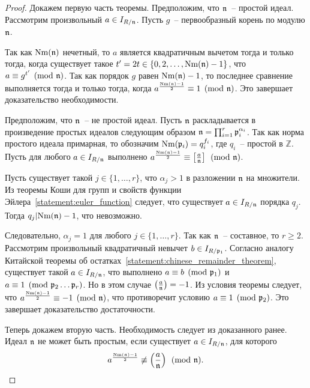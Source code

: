 \documentclass[_00_dissertation.tex]{subfiles}
\begin{document}
\begin{proof}
    Докажем первую часть теоремы.
    Предположим, что $\mathfrak{n}$~-- простой идеал.
    Рассмотрим произвольный $a \in I_{R/\mathfrak{n}}$.
    Пусть $g$~-- первообразный корень по модулю $\mathfrak{n}$.

    Так как $\textrm{Nm}(\mathfrak{n})$ нечетный, то $a$ является квадратичным вычетом тогда и только тогда, когда существует такое $t' = 2t \in \{0, 2, \dots, \textrm{Nm}(\mathfrak{n}) - 1\}$, что $a \equiv g^{t'} \pmod{\mathfrak{n}}$.
    Так как порядок $g$ равен $\textrm{Nm}(\mathfrak{n}) - 1$, то последнее сравнение выполняется тогда и только тогда, когда $a^{\frac{\textrm{Nm}(\mathfrak{n}) - 1}{2}} \equiv 1 \pmod{\mathfrak{n}}$.
    Это завершает доказательство необходимости.

    Предположим, что $\mathfrak{n}$~-- не простой идеал.
    Пусть $\mathfrak{n}$ раскладывается в произведение простых идеалов следующим образом $\mathfrak{n} = \prod_{i=1}^{r} \mathfrak{p}_i^{\alpha_i}$.
    Так как норма простого идеала примарная, то обозначим $\textrm{Nm}(\mathfrak{p}_i) = q_i^{f_i}$, где $q_i$~-- простой в $\mathbb{Z}$.
    Пусть для любого $a \in I_{R/\mathfrak{n}}$ выполнено $a^{\frac{\textrm{Nm}(\mathfrak{n}) - 1}{2}} \equiv \left[\frac{a}{\mathfrak{n}}\right] \pmod{\mathfrak{n}}$.

    Пусть существует такой $j \in \{1, \dots, r\}$, что $\alpha_j > 1$ в разложении $\mathfrak{n}$ на множители.
    Из теоремы Коши для групп и свойств функции Эйлера~\ref{statement:euler_function} следует, что существует $a \in I_{R/\mathfrak{n}}$ порядка $q_j$.
    Тогда $q_j | \textrm{Nm}(\mathfrak{n}) - 1$, что невозможно.

    Следовательно, $\alpha_j = 1$ для любого $j \in \{1, \ldots, r\}$.
    Так как $\mathfrak{n}$~-- составное, то $r \ge 2$.
    Рассмотрим произвольный квадратичный невычет $b \in I_{R/\mathfrak{p}_1}$.
    Согласно аналогу Китайской теоремы об остатках~\ref{statement:chinese_remainder_theorem}, существует такой $a \in I_{R/\mathfrak{n}}$, что выполнено $a \equiv b \pmod{\mathfrak{p}_1}$ и $a \equiv 1 \pmod{\mathfrak{p}_2\dots\mathfrak{p}_r}$.
    Но в этом случае $\left(\frac{a}{\mathfrak{n}}\right) = -1$.
    Из условия теоремы следует, что $a^{\frac{\textrm{Nm}(\mathfrak{n}) - 1}{2}} \equiv -1 \pmod{\mathfrak{n}}$, что противоречит условию $a \equiv 1 \pmod{\mathfrak{p}_2}$.
    Это завершает доказательство достаточности.

    Теперь докажем вторую часть.
    Необходимость следует из доказанного ранее.
    Идеал $\mathfrak{n}$ не может быть простым, если существует $a \in I_{R/\mathfrak{n}}$, для которого
    \begin{equation*}
        a^{\frac{\textrm{Nm}(\mathfrak{n}) - 1}{2}} \not\equiv \left(\frac{a}{\mathfrak{n}}\right) \pmod{\mathfrak{n}}.
    \end{equation*}


\end{proof}
\end{document}
